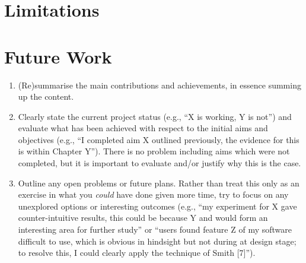 \documentclass[oneside,%
                    author={Malak Hajji},
                    degree={BSc},
                    title={Designing An Accessible Computational Toolkit For Students},
                  subtitle={With Mixed Visual Abilities}]{dissertation}
\begin{document}
\section{Limitations}

\section{Future Work}
\begin{enumerate}
\item (Re)summarise the main contributions and achievements, in essence
      summing up the content.
\item Clearly state the current project status (e.g., ``X is working, Y 
      is not'') and evaluate what has been achieved with respect to the 
      initial aims and objectives (e.g., ``I completed aim X outlined 
      previously, the evidence for this is within Chapter Y'').  There 
      is no problem including aims which were not completed, but it is 
      important to evaluate and/or justify why this is the case.
\item Outline any open problems or future plans.  Rather than treat this
      only as an exercise in what you {\em could} have done given more 
      time, try to focus on any unexplored options or interesting outcomes
      (e.g., ``my experiment for X gave counter-intuitive results, this 
      could be because Y and would form an interesting area for further 
      study'' or ``users found feature Z of my software difficult to use,
      which is obvious in hindsight but not during at design stage; to 
      resolve this, I could clearly apply the technique of Smith [7]'').
\end{enumerate}


%
%
%
\end{document}
